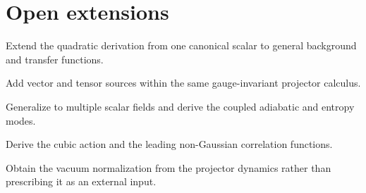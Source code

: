 \section{Open extensions}
\begin{nextsteps}
\item Extend the quadratic derivation from one canonical scalar to general background and transfer functions.
\item Add vector and tensor sources within the same gauge-invariant projector calculus.
\item Generalize to multiple scalar fields and derive the coupled adiabatic and entropy modes.
\item Derive the cubic action and the leading non-Gaussian correlation functions.
\item Obtain the vacuum normalization from the projector dynamics rather than prescribing it as an external input.
\end{nextsteps}
